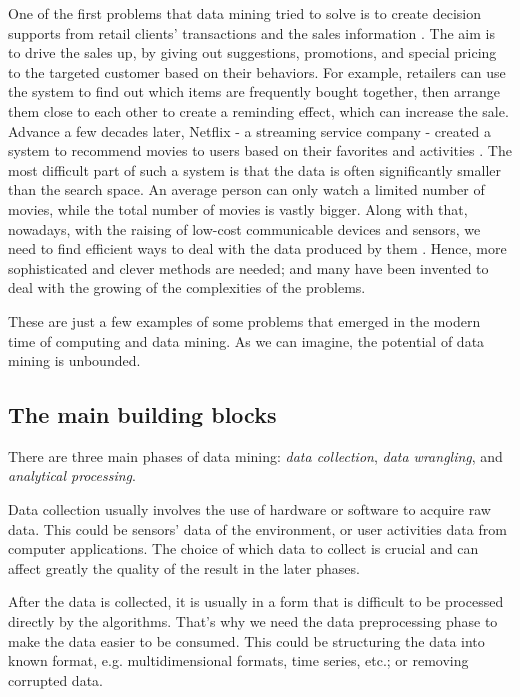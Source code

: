 One of the first problems that data mining tried to solve is to create decision supports from retail clients' transactions and the sales information \citep{coenen_datamining_2011}. 
The aim is to drive the sales up, by giving out suggestions, promotions, and special pricing to the targeted customer based on their behaviors.
For example, retailers can use the system to find out which items are frequently bought together, then arrange them close to each other to create a reminding effect, which can increase the sale.
Advance a few decades later, Netflix - a streaming service company - created a system to recommend movies to users based on their favorites and activities \citep{netflix_rs_2016}.
The most difficult part of such a system is that the data is often significantly smaller than the search space.
An average person can only watch a limited number of movies, while the total number of movies is vastly bigger.
Along with that, nowadays, with the raising of low-cost communicable devices and sensors, we need to find efficient ways to deal with the data produced by them \citep{data_mining_iot_2014}.
Hence, more sophisticated and clever methods are needed; and many have been invented to deal with the growing of the complexities of the problems.

These are just a few examples of some problems that emerged in the modern time of computing and data mining.
As we can imagine, the potential of data mining is unbounded.

\subsection{The main building blocks}
\label{sub:building_blocks}

There are three main phases of data mining: \textit{data collection}, \textit{data wrangling}, and \textit{analytical processing}.

Data collection usually involves the use of hardware or software to acquire raw data.
This could be sensors' data of the environment, or user activities data from computer applications.
The choice of which data to collect is crucial and can affect greatly the quality of the result in the later phases.

After the data is collected, it is usually in a form that is difficult to be processed directly by the algorithms.
That's why we need the data preprocessing phase to make the data easier to be consumed.
This could be structuring the data into known format, e.g. multidimensional formats, time series, etc.; or removing corrupted data.

